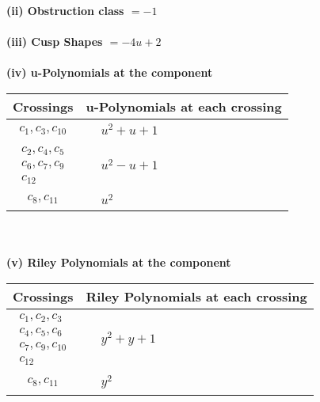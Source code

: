 \documentclass[1p]{elsarticle_modified}
\theoremstyle{definition}
\begin{document}
\flushleft \textbf{(ii) Obstruction class $= -1$}\\~\\
\flushleft \textbf{(iii) Cusp Shapes $= -4 u+2$}\\~\\
\newpage\renewcommand{\arraystretch}{1}
\flushleft \textbf{(iv) u-Polynomials at the component}\newline \\
\begin{tabular}{m{50pt}|m{274pt}}
Crossings & \hspace{64pt}u-Polynomials at each crossing \\
\hline $$\begin{aligned}c_{1},c_{3},c_{10}\end{aligned}$$&$\begin{aligned}
&u^2+u+1
\end{aligned}$\\
\hline $$\begin{aligned}c_{2},c_{4},c_{5}\\c_{6},c_{7},c_{9}\\c_{12}\end{aligned}$$&$\begin{aligned}
&u^2- u+1
\end{aligned}$\\
\hline $$\begin{aligned}c_{8},c_{11}\end{aligned}$$&$\begin{aligned}
&u^2
\end{aligned}$\\
\hline
\end{tabular}\\~\\
\newpage\renewcommand{\arraystretch}{1}
\flushleft \textbf{(v) Riley Polynomials at the component}\newline \\
\begin{tabular}{m{50pt}|m{274pt}}
Crossings & \hspace{64pt}Riley Polynomials at each crossing \\
\hline $$\begin{aligned}c_{1},c_{2},c_{3}\\c_{4},c_{5},c_{6}\\c_{7},c_{9},c_{10}\\c_{12}\end{aligned}$$&$\begin{aligned}
&y^2+y+1
\end{aligned}$\\
\hline $$\begin{aligned}c_{8},c_{11}\end{aligned}$$&$\begin{aligned}
&y^2
\end{aligned}$\\
\hline
\end{tabular}\\~\\
\end{document}
